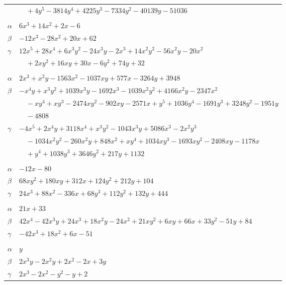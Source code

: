 \documentclass[11pt]{article}
\begin{document}
\begin{longtable}{@{}ll@{}}
 & $\quad +4y^{5}-3814y^{4}+4225y^{3}-7334y^{2}-40139y-51036$\\
\addlinespace[3pt]
\multicolumn{2}{@{}l}{$\{i,j\}=\{34,213\}$, $k_{ij}=2^{3}\cdot 13$}\\
$\alpha$ & $6x^{3}+14x^{2}+2x-6$\\
$\beta$ & $-12x^{3}-28x^{2}+20x+62$\\
$\gamma$ & $12x^{5}+28x^{4}+6x^{3}y^{2}-24x^{3}y-2x^{3}+14x^{2}y^{2}-56x^{2}y-20x^{2}$\\
 & $\quad +2xy^{2}+16xy+30x-6y^{2}+74y+32$\\
\addlinespace[3pt]
\multicolumn{2}{@{}l}{$\{i,j\}=\{35,42\}$, $k_{ij}=2^{3}\cdot 3^{2}\cdot 13\cdot 19$}\\
$\alpha$ & $2x^{3}+x^{2}y-1563x^{2}-1037xy+577x-3264y+3948$\\
$\beta$ & $-x^{4}y+x^{3}y^{2}+1039x^{3}y-1692x^{3}-1039x^{2}y^{2}+4166x^{2}y-2347x^{2}$\\
 & $\quad -xy^{4}+xy^{3}-2474xy^{2}-902xy-2571x+y^{5}+1036y^{4}-1691y^{3}+3248y^{2}-1951y$\\
 & $\quad -4808$\\
$\gamma$ & $-4x^{5}+2x^{4}y+3118x^{4}+x^{3}y^{2}-1043x^{3}y+5086x^{3}-2x^{2}y^{3}$\\
 & $\quad -1034x^{2}y^{2}-260x^{2}y+848x^{2}+xy^{4}+1034xy^{3}-1693xy^{2}-2408xy-1178x$\\
 & $\quad +y^{4}+1038y^{3}+3646y^{2}+217y+1132$\\
\addlinespace[3pt]
\multicolumn{2}{@{}l}{$\{i,j\}=\{35,73\}$, $k_{ij}=2^{2}\cdot 13\cdot 19$}\\
$\alpha$ & $-12x-80$\\
$\beta$ & $68xy^{2}+180xy+312x+124y^{2}+212y+104$\\
$\gamma$ & $24x^{3}+88x^{2}-336x+68y^{3}+112y^{2}+132y+444$\\
\addlinespace[3pt]
\multicolumn{2}{@{}l}{$\{i,j\}=\{36,118\}$, $k_{ij}=2^{4}\cdot 3$}\\
$\alpha$ & $21x+33$\\
$\beta$ & $42x^{4}-42x^{3}y+24x^{3}+18x^{2}y-24x^{2}+21xy^{2}+6xy+66x+33y^{2}-51y+84$\\
$\gamma$ & $-42x^{3}+18x^{2}+6x-51$\\
\addlinespace[3pt]
\multicolumn{2}{@{}l}{$\{i,j\}=\{37,38\}$, $k_{ij}=2$}\\
$\alpha$ & $y$\\
$\beta$ & $2x^{3}y-2x^{2}y+2x^{2}-2x+3y$\\
$\gamma$ & $2x^{3}-2x^{2}-y^{2}-y+2$\\

\end{longtable}
\end{document}
